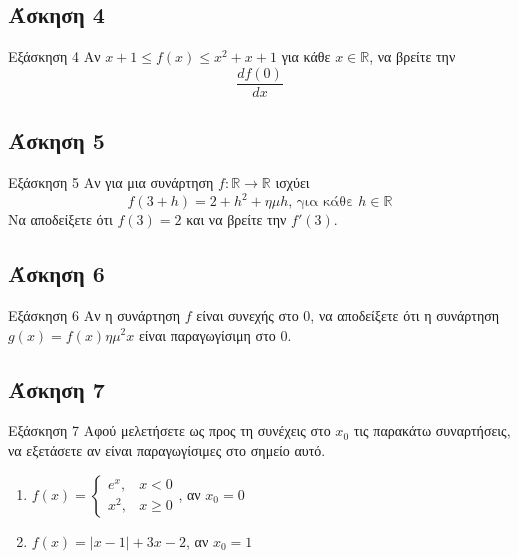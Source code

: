 \documentclass[greek]{beamer}
\begin{document}
\subsection{Άσκηση 4}
\begin{frame}[label=Άσκηση4]{Εξάσκηση 4}
 Αν $x+1\le f(x) \le x^2+x+1$ για κάθε $x\in\mathbb{R}$, να βρείτε την
 $$\frac{df(0)}{dx}$$

\end{frame}

\subsection{Άσκηση 5}
\begin{frame}[label=Άσκηση5]{Εξάσκηση 5}
 Αν για μια συνάρτηση $f:\mathbb{R}\to\mathbb{R}$ ισχύει
 $$f(3+h)=2+h^2+ημh \text{, για κάθε } h\in\mathbb{R}$$
 Να αποδείξετε ότι $f(3)=2$ και να βρείτε την $f'(3)$.

\end{frame}

\subsection{Άσκηση 6}
\begin{frame}[label=Άσκηση6]{Εξάσκηση 6}
 Αν η συνάρτηση $f$ είναι συνεχής στο $0$, να αποδείξετε ότι η συνάρτηση $g(x)=f(x)ημ^2x$ είναι παραγωγίσιμη στο $0$.

\end{frame}

\subsection{Άσκηση 7}
\begin{frame}{Εξάσκηση 7}
 Αφού μελετήσετε ως προς τη συνέχεις στο $x_0$ τις παρακάτω συναρτήσεις, να εξετάσετε αν είναι παραγωγίσιμες στο σημείο αυτό.
 \begin{enumerate}
  \item<1-> $f(x)=\begin{cases}
     e^x, & x<0    \\
     x^2, & x\ge 0
    \end{cases}$, αν $x_0=0$
  \item<2-> $f(x)=|x-1|+3x-2$, αν $x_0=1$
 \end{enumerate}
\end{frame}
\end{document}

